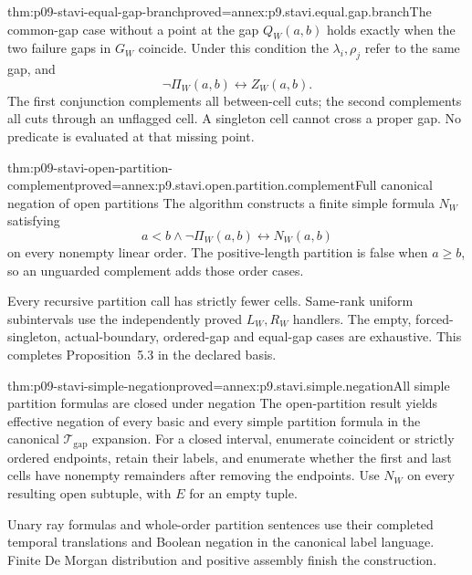 \begin{hblemma}{thm:p09-stavi-equal-gap-branch}{proved=annex:p9.stavi.equal.gap.branch}{The common-gap case without a point at the gap}
\(Q_W(a,b)\) holds exactly when the two
failure gaps in \(G_W\) coincide. Under
this condition the \(\lambda_i,\rho_j\)
refer to the same gap, and
\[
                              \neg\Pi_W(a,b)\longleftrightarrow Z_W(a,b).
\]
The first conjunction complements all
between-cell cuts; the second complements
all cuts through an unflagged cell.
A singleton cell cannot cross a proper
gap. No predicate is evaluated at that
missing point.
\end{hblemma}

\begin{hbtheorem}{thm:p09-stavi-open-partition-complement}{proved=annex:p9.stavi.open.partition.complement}{Full canonical negation of open partitions}
The algorithm constructs a finite simple
formula \(N_W\) satisfying
\[
                         a<b\land\neg\Pi_W(a,b)\longleftrightarrow N_W(a,b)
\]
on every nonempty linear order.
The positive-length partition is false
when \(a\geq b\), so an unguarded
complement adds those order cases.

Every recursive partition call has
strictly fewer cells. Same-rank uniform
subintervals use the independently proved
\(L_W,R_W\) handlers. The empty,
forced-singleton, actual-boundary,
ordered-gap and equal-gap cases are
exhaustive. This completes
Proposition~5.3 in the declared basis.
\end{hbtheorem}

\begin{hbtheorem}{thm:p09-stavi-simple-negation}{proved=annex:p9.stavi.simple.negation}{All simple partition formulas are closed under negation}
The open-partition result yields effective
negation of every basic and every simple
partition formula in the canonical
\(\mathcal T_{\mathrm{gap}}\) expansion.
For a closed interval, enumerate coincident
or strictly ordered endpoints, retain
their labels, and enumerate whether the
first and last cells have nonempty
remainders after removing the endpoints.
Use \(N_W\) on every resulting open
subtuple, with \(E\) for an empty tuple.

Unary ray formulas and whole-order
partition sentences use their completed
temporal translations and Boolean
negation in the canonical label language.
Finite De Morgan distribution and positive
assembly finish the construction.
\end{hbtheorem}

